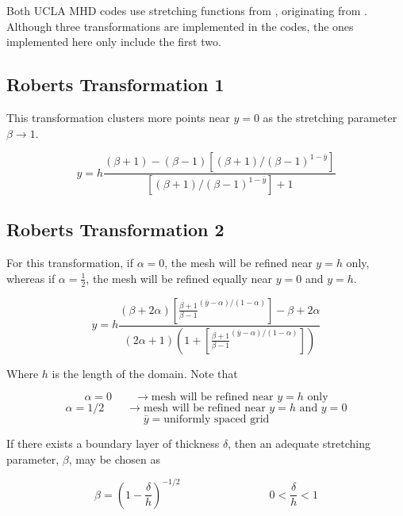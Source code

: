 \documentclass[11pt]{article}
\begin{document}
Both UCLA MHD codes use stretching functions from \cite{pletcher2012computational}, originating from \cite{Roberts1971}. Although three transformations are implemented in the codes, the ones implemented here only include the first two.

\subsection{Roberts Transformation 1}

This transformation clusters more points near $y=0$ as the stretching parameter $\beta \rightarrow 1$.

\begin{equation}
	y
	=
	h
	\frac{(\beta+1)-(\beta-1) \left[ (\beta+1)/(\beta-1)^{1-\bar{y}} \right] }
	{\left[ (\beta+1)/(\beta-1)^{1-\bar{y}} \right]+1}
\end{equation}

\subsection{Roberts Transformation 2}
For this transformation, if $\alpha=0$, the mesh will be refined near $y=h$ only, whereas if $\alpha= \frac{1}{2}$, the mesh will be refined equally near $y=0$ and $y=h$.

\begin{equation}
	y 
	= 
	h 
	\frac{
	(\beta + 2 \alpha)
	\left[ \frac{\beta+1}{\beta-1}^{(\bar{y}-\alpha)/(1-\alpha)} \right] - \beta + 2 \alpha}
	{
	(2\alpha+1)
	\left(1+\left[ \frac{\beta+1}{\beta-1}^{(\bar{y}-\alpha)/(1-\alpha)} \right]
	\right)
	}
\end{equation}

Where $h$ is the length of the domain. Note that

\begin{equation}
	\alpha = 0 \qquad \rightarrow \text{mesh will be refined near $y=h$ only}
\end{equation}
\begin{equation}
	\alpha = 1/2 \qquad \rightarrow \text{mesh will be refined near $y=h$ and $y=0$}
\end{equation}
\begin{equation}
	\bar{y} = \text{uniformly spaced grid}
\end{equation}

If there exists a boundary layer of thickness $\delta$, then an adequate stretching parameter, $\beta$, may be chosen as

\begin{equation}
	\beta = \left( 1 - \frac{\delta}{h} \right)^{-1/2}
	\qquad \qquad
	\qquad \qquad
	0 < \frac{\delta}{h} < 1
\end{equation}
\end{document}
